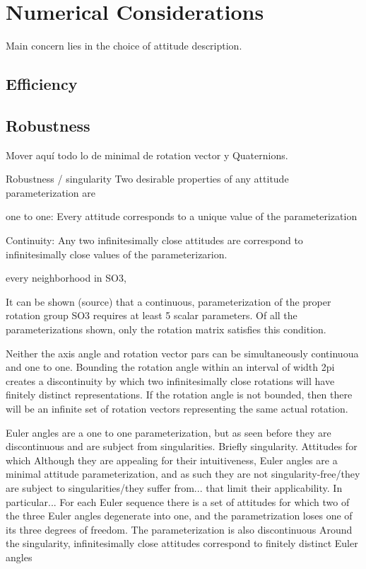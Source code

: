 \chapter{Numerical Considerations} %

Main concern lies in the choice of attitude description.

\section{Efficiency} %

\section{Robustness}
Mover aquí todo lo de minimal de rotation vector y Quaternions.

Robustness / singularity
Two desirable properties of any attitude parameterization are

one to one: Every attitude corresponds to a unique value of the parameterization

Continuity: Any two infinitesimally close attitudes are correspond to infinitesimally close values of the parameterizarion.

every neighborhood in SO3,

It can be shown (source) that a continuous, parameterization of the proper rotation group SO3 requires at least 5 scalar parameters. Of all the parameterizations shown, only the rotation matrix satisfies this condition.

Neither the axis angle and rotation vector pars can be simultaneously continuoua and one to one. Bounding the rotation angle within an interval of width 2pi creates a discontinuity by which two infinitesimally close rotations will have finitely distinct representations. If the rotation angle is not bounded, then there will be an infinite set of rotation vectors representing the same actual rotation.

Euler angles are a one to one parameterization, but as seen before they are discontinuous and are subject from singularities. Briefly singularity. Attitudes for which
Although they are appealing for their intuitiveness, Euler angles are a minimal attitude parameterization, and as such they are not singularity-free/they are subject to singularities/they suffer from... that limit their applicability. In particular... For each Euler sequence there is a set of attitudes for which two of the three Euler angles degenerate into one, and the parametrization loses one of its three degrees of freedom. The parameterization is also discontinuous Around the singularity, infinitesimally close attitudes correspond to finitely distinct Euler angles

